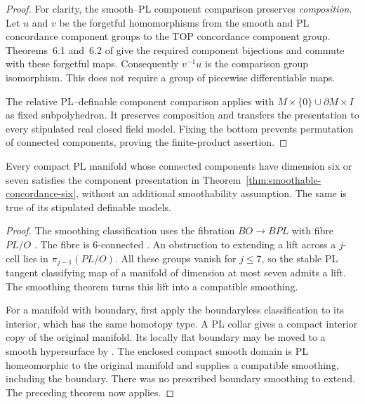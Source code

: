 \begin{proof}
For clarity, the smooth--PL component comparison preserves
\emph{composition}. Let $u$ and $v$ be the forgetful homomorphisms
from the smooth and PL concordance component groups to the TOP
concordance component group. Theorems~6.1 and~6.2 of
\cite[pp.~41--43]{BurgheleaLashof1974II} give the required
component bijections and commute with these forgetful maps.
Consequently $v^{-1}u$ is the comparison group isomorphism.
This does not require a group of piecewise differentiable maps.

The relative PL--definable component comparison applies with
$M\times\{0\}\cup\partial M\times I$ as fixed subpolyhedron.
It preserves composition and transfers the presentation to every
stipulated real closed field model. Fixing the bottom prevents
permutation of connected components, proving the finite-product
assertion.
\end{proof}

\begin{corollary}\label{cor:pl-six-seven-components}
Every compact PL manifold whose connected components have
dimension six or seven satisfies the component presentation in
Theorem~\ref{thm:smoothable-concordance-six}, without an additional
smoothability assumption. The same is true of its stipulated
definable models.
\end{corollary}

\begin{proof}
The smoothing classification uses the fibration
$BO\to BPL$ with fibre $PL/O$
\cite[Part~II, Theorem~4.1, p.~108, and Theorem~5.3,
pp.~122--123]{HirschMazur1974}. The fibre is $6$-connected
\cite[Part~II, p.~123]{HirschMazur1974}. An obstruction to extending
a lift across a $j$-cell lies in $\pi_{j-1}(PL/O)$.
All these groups vanish for $j\leq7$, so the stable PL tangent
classifying map of a manifold of dimension at most seven admits
a lift. The smoothing theorem turns this lift into a compatible
smoothing.

For a manifold with boundary, first apply the boundaryless
classification to its interior, which has the same homotopy type.
A PL collar gives a compact interior copy of the original manifold.
Its locally flat boundary may be moved to a smooth hypersurface by
\cite[Part~I, Theorem~7.4, pp.~37--38]{HirschMazur1974}.
The enclosed compact smooth domain is PL homeomorphic to the
original manifold and supplies a compatible smoothing, including
the boundary. There was no prescribed boundary smoothing to extend.
The preceding theorem now applies.
\end{proof}

